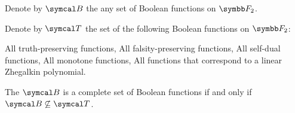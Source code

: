 \begin{theorem}\label{thm:posts_completeness_theorem}\cite{Pelletier1990}
  Denote by \( \Cal{B} \) the any set of Boolean functions on \( \F_2 \).

  Denote by \( \Cal{T} \) the set of the following Boolean functions on \( \F_2 \):
  \begin{thmenum}
     All truth-preserving functions,
     All falsity-preserving functions,
     All self-dual functions,
     All monotone functions,
     All functions that correspond to a linear Zhegalkin polynomial.
  \end{thmenum}

  The \( \Cal{B} \) is a complete set of Boolean functions if and only if \( \Cal{B} \not\subseteq \Cal{T} \).
\end{theorem}

